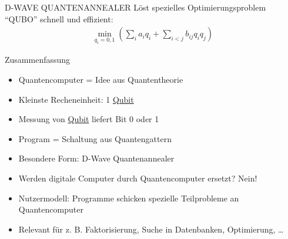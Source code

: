 \begin{defi}[Quantencomputer]{D-WAVE QUANTENANNEALER}
    Löst spezielles Optimierungsproblem \enquote{QUBO} schnell und effizient:
    \begin{align*}
        \min\limits_{q_i = 0,1}\left(\sum\limits_i a_i q_i + \sum\limits_{i<j} b_{ij} q_i q_j\right)
    \end{align*}
\end{defi}

\begin{bonus}[Quantencomputer]{Zusammenfassung}
    \begin{itemize}
        \item Quantencomputer = Idee aus Quantentheorie
        \item Kleinste Recheneinheit: 1 \hyperlink{defi:Qubit}{Qubit}
        \item Messung von \hyperlink{defi:Qubit}{Qubit} liefert Bit 0 oder 1
        \item Program = Schaltung aus Quantengattern
        \item Besondere Form: D-Wave Quantenannealer
        \item Werden digitale Computer durch Quantencomputer ersetzt? Nein!
        \item Nutzermodell: Programme schicken spezielle Teilprobleme an Quantencomputer
        \item Relevant für z. B. Faktorisierung, Suche in Datenbanken, Optimierung, \ldots
    \end{itemize}
\end{bonus}

